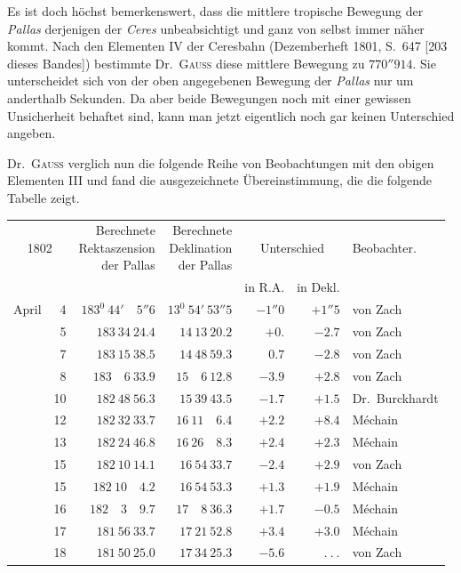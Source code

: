 Es ist doch höchst bemerkenswert, dass die mittlere tropische Bewegung der \textit{Pallas} derjenigen der \textit{Ceres} unbeabsichtigt und ganz von selbst immer näher kommt. Nach den Elementen IV der Ceresbahn (Dezemberheft 1801, S.\ 647 [203 dieses Bandes]) bestimmte Dr.\ \textsc{Gauß} diese mittlere Bewegung zu $770''914$. Sie unterscheidet sich von der oben angegebenen Bewegung der \textit{Pallas} nur um anderthalb Sekunden. Da aber beide Bewegungen noch mit einer gewissen Unsicherheit behaftet sind, kann man jetzt eigentlich noch gar keinen Unterschied angeben.

Dr.\ \textsc{Gauß} verglich nun die folgende Reihe von Beobachtungen mit den obigen Elementen III und fand die ausgezeichnete Übereinstimmung, die die folgende Tabelle zeigt.
\begin{center}
{\small\setlength{\tabcolsep}{4pt}
\begin{tabular}{r r|r|r|r|r|l}
\multicolumn{2}{c|}{1802}&\shortstack{Berechnete\\Rektaszension\\der Pallas}&\shortstack{Berechnete\\Deklination\\der Pallas}&\multicolumn{2}{c|}{Unterschied}&Beobachter.\\
\multicolumn{2}{c|}{}&&&in R.A.&in Dekl.&\\\hline
April&4&$183^0\ 44'\quad5''6$&$13^0\ 54'\ 53''5$&$-1''0$&$+1''5$&von Zach\\
&5&$183\ 34\ 24.4$&$14\ 13\ 20.2$&$+0.$&$-2.7$&von Zach\\
&7&$183\ 15\ 38.5$&$14\ 48\ 59.3$&$0.7$&$-2.8$&von Zach\\
&8&$183\quad6\ 33.9$&$15\quad6\ 12.8$&$-3.9$&$+2.8$&von Zach\\
&10&$182\ 48\ 56.3$&$15\ 39\ 43.5$&$-1.7$&$+1.5$&Dr.\ Burckhardt\\
&12&$182\ 32\ 33.7$&$16\ 11\quad6.4$&$+2.2$&$+8.4$&Méchain\\
&13&$182\ 24\ 46.8$&$16\ 26\quad8.3$&$+2.4$&$+2.3$&Méchain\\
&15&$182\ 10\ 14.1$&$16\ 54\ 33.7$&$-2.4$&$+2.9$&von Zach\\
&15&$182\ 10\quad4.2$&$16\ 54\ 53.3$&$+1.3$&$+1.9$&Méchain\\
&16&$182\quad3\quad9.7$&$17\quad8\ 36.3$&$+1.7$&$-0.5$&Méchain\\
&17&$181\ 56\ 33.7$&$17\ 21\ 52.8$&$+3.4$&$+3.0$&Méchain\\
&18&$181\ 50\ 25.0$&$17\ 34\ 25.3$&$-5.6$&$\ .\ .\ .$&von Zach\\

\end{tabular}}
\end{center}
